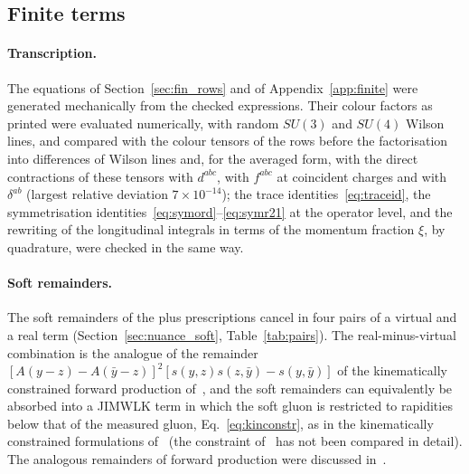 \subsection{Finite terms}\label{sec:lit_finite}

\paragraph{Transcription.} The equations of Section~\ref{sec:fin_rows} and of Appendix~\ref{app:finite} were generated mechanically from the checked expressions. Their colour factors as printed were evaluated numerically, with random $SU(3)$ and $SU(4)$ Wilson lines, and compared with the colour tensors of the rows before the factorisation into differences of Wilson lines and, for the averaged form, with the direct contractions of these tensors with $d^{abc}$, with $f^{abc}$ at coincident charges and with $\delta^{ab}$ (largest relative deviation $7\times10^{-14}$); the trace identities~\eqref{eq:traceid}, the symmetrisation identities~\eqref{eq:symord}--\eqref{eq:symr21} at the operator level, and the rewriting of the longitudinal integrals in terms of the momentum fraction $\xi$, by quadrature, were checked in the same way.

\paragraph{Soft remainders.} The soft remainders of the plus prescriptions cancel in four pairs of a virtual and a real term (Section~\ref{sec:nuance_soft}, Table~\ref{tab:pairs}). The real-minus-virtual combination is the analogue of the remainder $[A(y-z)-A(\bar y-z)]^2[s(y,z)s(z,\bar y)-s(y,\bar y)]$ of the kinematically constrained forward production of~\cite{Altinoluk:2014eka}, and the soft remainders can equivalently be absorbed into a JIMWLK term in which the soft gluon is restricted to rapidities below that of the measured gluon, Eq.~\eqref{eq:kinconstr}, as in the kinematically constrained formulations of~\cite{Altinoluk:2014eka,Ducloue:2016shw} (the constraint of~\cite{Ducloue:2016shw} has not been compared in detail). The analogous remainders of forward production were discussed in~\cite{Stasto:2013cha,Altinoluk:2014eka,Ducloue:2016shw}.

